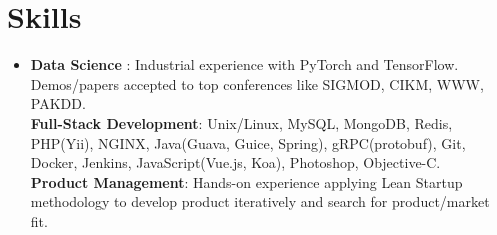 \documentclass[letterpaper,9pt]{article}
\newcommand{\resumeSubHeadingListStart}{\begin{itemize}[leftmargin=*]}
\newcommand{\resumeSubHeadingListEnd}{\end{itemize}}
\begin{document}
\section{Skills}
  \resumeSubHeadingListStart
    \item{\textbf{Data Science}
      {: Industrial experience with PyTorch and TensorFlow. Demos/papers accepted to top conferences like SIGMOD, CIKM, WWW, PAKDD.}
    }\\
    \textbf{Full-Stack Development}{:
      Unix/Linux, MySQL, MongoDB, Redis, PHP(Yii), NGINX, Java(Guava, Guice, Spring), gRPC(protobuf), Git, Docker, Jenkins, JavaScript(Vue.js, Koa), Photoshop, Objective-C.
    }\\
    \textbf{Product Management}{:
      Hands-on experience applying Lean Startup methodology to develop product iteratively and search for product/market fit.
    }
  \resumeSubHeadingListEnd


  
\end{document}
